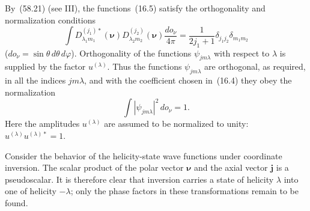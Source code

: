 By~(58.21) (see III), the functions~(16.5) satisfy the orthogonality and normalization conditions
\begin{equation}
\int D^{(j_1)*}_{\lambda_1m_1}(\boldsymbol\nu)
D^{(j_2)}_{\lambda_2m_2}(\boldsymbol\nu)\frac{do_\nu}{4\pi}
=\frac{1}{2j_1+1}\delta_{j_1j_2}\delta_{m_1m_2}
\tag{16.6}
\end{equation}
($do_\nu=\sin\theta\,d\theta\,d\varphi$). Orthogonality of the functions $\psi_{jm\lambda}$ with respect to $\lambda$ is supplied by the factor $u^{(\lambda)}$. Thus the functions $\psi_{jm\lambda}$ are orthogonal, as required, in all the indices $jm\lambda$, and with the coefficient chosen in~(16.4) they obey the normalization
\begin{equation}
\int|\psi_{jm\lambda}|^2\,do_\nu=1.
\tag{16.7}
\end{equation}
Here the amplitudes $u^{(\lambda)}$ are assumed to be normalized to unity: $u^{(\lambda)}u^{(\lambda)*}=1$.

Consider the behavior of the helicity-state wave functions under coordinate inversion. The scalar product of the polar vector $\boldsymbol\nu$ and the axial vector $\mathbf j$ is a pseudoscalar. It is therefore clear that inversion carries a state of helicity $\lambda$ into one of helicity $-\lambda$; only the phase factors in these transformations remain to be found.

